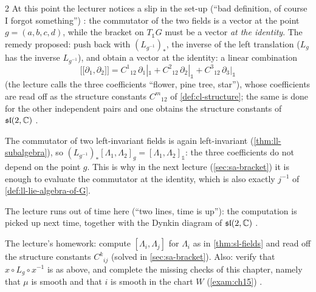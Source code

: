 \begin{paracol}{2}
At this point the lecturer notices a slip in the set-up (``bad definition, of course I forgot something'') : the commutator of the two fields is a vector at the point $g=(a,b,c,d)$, while the bracket on $T_{\mathbb 1}G$ must be a vector \emph{at the identity}. The remedy proposed: push back with $(L_{g^{-1}})_*$, the inverse of the left translation ($L_g$ has the inverse $L_{g^{-1}}$), and obtain a vector at the identity: a linear combination
\[
  \bigl[\!\bigl[\partial_1,\partial_2\bigr]\!\bigr]=C^1{}_{12}\,\partial_1|_{\mathbb 1}+C^2{}_{12}\,\partial_2|_{\mathbb 1}+C^3{}_{12}\,\partial_3|_{\mathbb 1}
\]
(the lecture calls the three coefficients ``flower, pine tree, star''), whose coefficients are read off as the structure constants $C^m{}_{12}$ of \cref{def:cl-structure}; the same is done for the other independent pairs and one obtains the structure constants of $\mathfrak{sl}(2,\mathbb{C})$        .
\begin{coursenote}
The commutator of two left-invariant fields is again left-invariant (\cref{thm:ll-subalgebra}), so $(L_{g^{-1}})_*[\Lambda_1,\Lambda_2]_g=[\Lambda_1,\Lambda_2]_{\mathbb 1}$: the three coefficients do not depend on the point $g$. This is why in the next lecture (\cref{sec:sa-bracket}) it is enough to evaluate the commutator at the identity, which is also exactly $j^{-1}$ of \cref{def:ll-lie-algebra-of-G}. 
\end{coursenote}
The lecture runs out of time here (``two lines, time is up''): the computation is picked up next time, together with the Dynkin diagram of $\mathfrak{sl}(2,\mathbb{C})$ .
\begin{exercise}\label{ex:sl-structure}
The lecture's homework: compute $[\Lambda_i,\Lambda_j]$ for $\Lambda_i$ as in \cref{thm:sl-fields} and read off the structure constants $C^k{}_{ij}$ (solved in \cref{sec:sa-bracket}). Also: verify that $x\circ L_g\circ x^{-1}$ is as above, and complete the missing checks of this chapter, namely that $\mu$ is smooth and that $i$ is smooth in the chart $W$ (\cref{exam:ch15}) .
\end{exercise}


\end{paracol}
